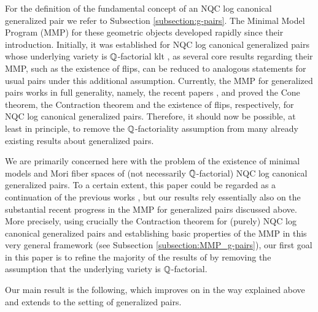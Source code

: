 	For the definition of the fundamental concept of an NQC log canonical generalized pair we refer to Subsection \ref{subsection:g-pairs}. The Minimal Model Program (MMP) for these geometric objects developed rapidly since their introduction. Initially, it was established for NQC log canonical generalized pairs whose underlying variety is $\mathbb{Q}$-factorial klt \cite{BZ16,HanLi22}, as several core results regarding their MMP, such as the existence of flips, can be reduced to analogous statements for usual pairs under this additional assumption. Currently, the MMP for generalized pairs works in full generality, namely, the recent papers \cite{HaconLiu21}, \cite{Xie22} and \cite{LX22b} proved the Cone theorem, the Contraction theorem and the existence of flips, respectively, for NQC log canonical generalized pairs.  Therefore, it should now be possible, at least in principle, to remove the $\mathbb{Q}$-factoriality assumption from many already existing results about generalized pairs.
	
	We are primarily concerned here with the problem of the existence of minimal models and Mori fiber spaces of (not necessarily $\mathbb{Q}$-factorial) NQC log canonical generalized pairs. To a certain extent, this paper could be regarded as a continuation of the previous works \cite{LT22a,LT22b}, but our results rely essentially also on the substantial recent progress in the MMP for generalized pairs discussed above. More precisely, using crucially the Contraction theorem for (purely) NQC log canonical generalized pairs \cite{Xie22} and establishing basic properties of the MMP in this very general framework (see Subsection \ref{subsection:MMP_g-pairs}), our first goal in this paper is to refine the majority of the results of \cite{LT22b} by removing the assumption that the underlying variety is $\mathbb{Q}$-factorial.
	
	Our main result is the following, which improves on \cite[Theorem 1.2]{LT22b} in the way explained above and extends \cite[Theorem 1.7]{HH20} to the setting of generalized pairs.
	
